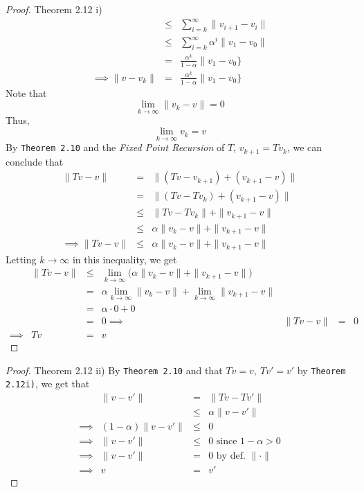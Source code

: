 \documentclass[11pt,a4paper]{article}
\begin{document}
\begin{proof}{Theorem 2.12 i)}
\[\begin{array}{rcl}
       &\leq&\sum_{i=k}^\infty\|v_{i+1}-v_i\|\\
       &\leq&\sum_{i=k}^\infty\alpha^i\|v_1-v_0\|\\
       &=&\frac{\alpha^k}{1-\alpha}\|v_1-v_0\}\\
       \implies\|v-v_k\|&=&\frac{\alpha^k}{1-\alpha}\|v_1-v_0\}
     \end{array}\]
     Note that
     \[ \lim_{k\to\infty}\|v_k-v\|=0 \]
     Thus,
     \[ \lim_{k\to\infty}v_k=v \]
     By \texttt{Theorem 2.10} and the \textit{Fixed Point Recursion} of $T$, $v_{k+1}=Tv_k$, we can conclude that
     \[\begin{array}{rcl}
       \|Tv-v\|&=&\|(Tv-v_{k+1})+(v_{k+1}-v)\|\\
       &=&\|(Tv-Tv_k)+(v_{k+1}-v)\|\\
       &\leq&\|Tv-Tv_k\|+\|v_{k+1}-v\|\\
       &\leq&\alpha\|v_k-v\|+\|v_{k+1}-v\|\\
       \implies\|Tv-v\|&\leq&\alpha\|v_k-v\|+\|v_{k+1}-v\|
     \end{array}\]
     Letting $k\to\infty$ in this inequality, we get
     \[\begin{array}{rrcl}
       &\|Tv-v\|&\leq&\lim_{k\to\infty}\big(\alpha\|v_k-v\|+\|v_{k+1}-v\|\big)\\
       &&=&\alpha\lim_{k\to\infty}\|v_k-v\|+\lim_{k\to\infty}\|v_{k+1}-v\|\\
       &&=&\alpha\cdot0+0\\
       &&=&0
       \implies&\|Tv-v\|&=&0\\
       \implies&Tv&=&v
     \end{array}\]
     \proved
  \end{proof}

  \begin{proof}{Theorem 2.12 ii)}
    By \texttt{Theorem 2.10} and that $Tv=v,\ Tv'=v'$ by \texttt{Theorem 2.12i)}, we get that
    \[\begin{array}{rrcl}
      &\|v-v'\|&=&\|Tv-Tv'\|\\
      &&\leq&\alpha\|v-v'\|\\
      \implies&(1-\alpha)\|v-v'\|&\leq&0\\
      \implies&\|v-v'\|&\leq&0\text{ since }1-\alpha>0\\
      \implies&\|v-v'\|&=&0\text{ by def. }\|\cdot\|\\
      \implies&v&=&v'
    \end{array}\]
    \proved
  \end{proof}
\end{document}
